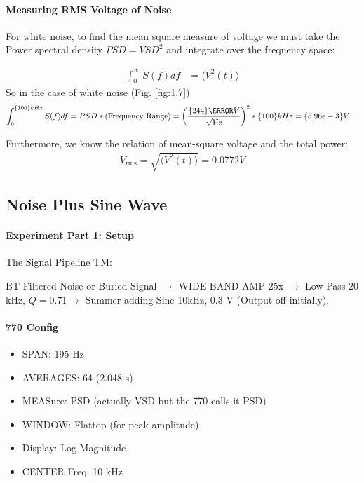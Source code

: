 \documentclass[../main.tex]{subfiles}
\begin{document}
\paragraph*{Measuring RMS Voltage of Noise}
For white noise, to find the mean square measure of voltage we must take the Power spectral density $PSD = VSD^2$ and integrate over the frequency space:

\begin{align*}
    \int_0^\infty S(f) df &= \langle V^2(t) \rangle
\end{align*}
So in the case of white noise (Fig. \ref{fig:1.7})
\begin{align*}
    \int_0^{\qty{100}{kHz}} S(f) df &= PSD * (\textrm{Frequency Range}) = \qt(\frac{\qty{244}{\micro V}}{\sqrt{\text{Hz}}})^2 * \qty{100}{kHz} = \qty{5.96e-3
    }{V}
\end{align*}

Furthermore, we know the relation of mean-square voltage and the total power:
\begin{align*}
    V_\text{rms} = \sqrt{\langle V^2(t) \rangle} = 0.0772 V
\end{align*}

\newpage
\subsection*{Noise Plus Sine Wave}

\paragraph*{Experiment Part 1: Setup} The Signal Pipeline TM:

BT Filtered Noise or Buried Signal $\to$ WIDE BAND AMP 25x $\to$ Low Pass 20 kHz, $Q=0.71 \to $ Summer adding Sine 10kHz, 0.3 V (Output off initially).

\paragraph*{770 Config}

\begin{itemize}
    \item SPAN: 195 Hz
    \item AVERAGES: 64 (2.048 s)
    \item MEASure: PSD (actually VSD but the 770 calls it PSD)
    \item WINDOW: Flattop (for peak amplitude)
    \item Display: Log Magnitude
    \item CENTER Freq. 10 kHz
\end{itemize}
\end{document}
